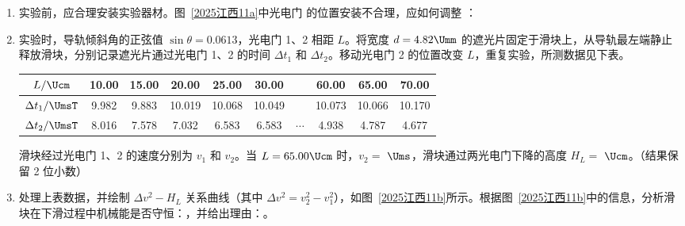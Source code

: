 \documentclass[\gkver]{gaokaozhenti}
\begin{document}
\begin{enumerate}
\begin{enumerate}
\item
实验前，应合理安装实验器材。图~\ref{2025江西11a}中光电门  的位置安装不合理，应如何调整 ：
\item
实验时，导轨倾斜角的正弦值 $\sin\theta = 0.0613$，光电门 1、2 相距 $L$。将宽度 $d = 4.82 \Umm$ 的遮光片固定于滑块上，从导轨最左端静止释放滑块，分别记录遮光片通过光电门 1、2 的时间 $\Delta t_{1}$ 和 $\Delta t_{2}$。移动光电门 2 的位置改变 $L$，重复实验，所测数据见下表。

\begin{center}
\begin{tabular}{|c|c|c|c|c|c|c|c|c|c|}
\hline
$L/\Ucm$ & 10.00 & 15.00 & 20.00 & 25.00 & 30.00 & & 60.00 & 65.00 & 70.00 \\
\hline
$\Delta t_{1}/\UmsT$ & 9.982 & 9.883 & 10.019 & 10.068 & 10.049 & & 10.073 & 10.066 & 10.170 \\
\hline
$\Delta t_{2}/\UmsT$ & 8.016 & 7.578 & 7.032 & 6.583 & 6.583 & $\cdots$ & 4.938 & 4.787 & 4.677 \\
\hline
\end{tabular}
\end{center}

滑块经过光电门 1、2 的速度分别为 $v_{1}$ 和 $v_{2}$。当 $L = 65.00 \Ucm$ 时，$v_{2} = $  $\Ums$，滑块通过两光电门下降的高度 $H_{L} = $  $\Ucm$。（结果保留 2 位小数）
\item
处理上表数据，并绘制 $\Delta v^{2}-H_{L}$ 关系曲线（其中 $\Delta v^{2} = v_{2}^{2} - v_{1}^{2}$），如图~\ref{2025江西11b}所示。根据图~\ref{2025江西11b}中的信息，分析滑块在下滑过程中机械能是否守恒：，并给出理由：。
\end{enumerate}


\end{enumerate}
\end{document}
